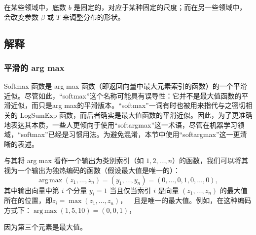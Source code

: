 在某些领域中，底数 $b$ 是固定的，对应于某种固定的尺度；而在另一些领域中，会改变参数 $\beta$ 或 $T$ 来调整分布的形状。
\subsection{解释}
\subsubsection{平滑的 arg max}
Softmax 函数是 arg max 函数（即返回向量中最大元素索引的函数）的一个平滑近似。尽管如此，“softmax”这个名称可能具有误导性：它并不是最大值函数的平滑近似，而只是arg max的平滑版本。“softmax”一词有时也被用来指代与之密切相关的 LogSumExp 函数，而后者确实是最大值函数的平滑近似。因此，为了更准确地表达其本质，一些人更倾向于使用“softargmax”这一术语，尽管在机器学习领域，“softmax”已经是习惯用法。为避免混淆，本节中使用“softargmax”这一更清晰的表述。

与其将 arg max 看作一个输出为类别索引（如 $1, 2, \dots, n$）的函数，我们可以将其视为一个输出为独热编码的函数（假设最大值是唯一的）：
$$
\operatorname{arg\,max}(z_1, \dots, z_n) = (y_1, \dots, y_n) = (0, \dots, 0, 1, 0, \dots, 0),~
$$
其中输出向量中第 $i$ 个分量 $y_i = 1$ 当且仅当索引 $i$ 是向量 $(z_1, \dots, z_n)$ 的最大值所在的位置，即$z_i = \max(z_1, \dots, z_n)，\quad \text{且是唯一的最大值}$。例如，在这种编码方式下：$\operatorname{arg\,max}(1, 5, 10) = (0, 0, 1)$，

因为第三个元素是最大值。
